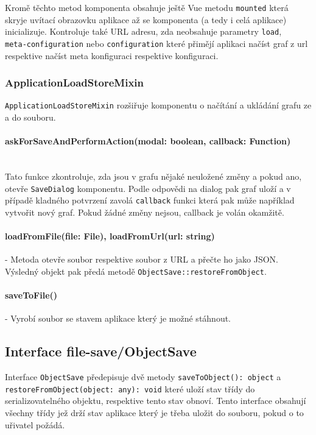 Kromě těchto metod komponenta obsahuje ještě Vue metodu \texttt{mounted} která skryje uvítací obrazovku aplikace až se komponenta (a tedy i celá aplikace) inicializuje. Kontroluje také URL adresu, zda neobsahuje parametry \texttt{load}, \\ \texttt{meta-configuration} nebo \texttt{configuration} které přimějí aplikaci načíst graf z url respektive načíst meta konfiguraci respektive konfiguraci.

\subsubsection{ApplicationLoadStoreMixin}
\texttt{ApplicationLoadStoreMixin} rozšiřuje komponentu o načítání a ukládání grafu ze a do souboru.

\paragraph{askForSaveAndPerformAction(modal: boolean, callback: Function)}\mbox{}\\ Tato funkce zkontroluje, zda jsou v grafu nějaké neuložené změny a pokud ano, otevře \texttt{SaveDialog} komponentu. Podle odpovědi na dialog pak graf uloží a v případě kladného potvrzení zavolá \texttt{callback} funkci která pak může například vytvořit nový graf. Pokud žádné změny nejsou, callback je volán okamžitě.

\paragraph{loadFromFile(file: File), loadFromUrl(url: string)} - Metoda otevře soubor respektive soubor z URL a přečte ho jako JSON. Výsledný objekt pak předá metodě \texttt{ObjectSave::restoreFromObject}.

\paragraph{saveToFile()} - Vyrobí soubor se stavem aplikace který je možné stáhnout.

\subsection{Interface file-save/ObjectSave}
Interface \texttt{ObjectSave} předepisuje dvě metody \texttt{saveToObject(): object} a \texttt{restoreFromObject(object: any): void} které uloží stav třídy do serializovatelného objektu, respektive tento stav obnoví. Tento interface obsahují všechny třídy jež drží stav aplikace který je třeba uložit do souboru, pokud o to uřivatel požádá.

